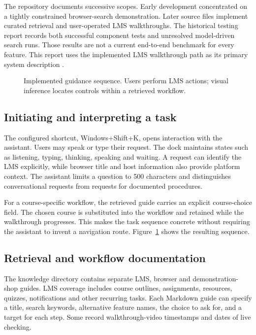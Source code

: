 \documentclass[11pt,a4paper]{article}
\begin{document}
The repository documents successive scopes. Early development concentrated on a tightly constrained browser-search demonstration. Later source files implement curated retrieval and user-operated LMS walkthroughs. The historical testing report records both successful component tests and unresolved model-driven search runs. Those results are not a current end-to-end benchmark for every feature. This report uses the implemented LMS walkthrough path as its primary system description \cite{project}.

\begin{figure}[htbp]\centering
{}
\caption{Implemented guidance sequence. Users perform LMS actions; visual inference locates controls within a retrieved workflow.}\label{fig:system}
\end{figure}

\subsection{Initiating and interpreting a task}
The configured shortcut, Windows+Shift+K, opens interaction with the assistant. Users may speak or type their request. The dock maintains states such as listening, typing, thinking, speaking and waiting. A request can identify the LMS explicitly, while browser title and host information also provide platform context. The assistant limits a question to 500 characters and distinguishes conversational requests from requests for documented procedures.

For a course-specific workflow, the retrieved guide carries an explicit course-choice field. The chosen course is substituted into the workflow and retained while the walkthrough progresses. This makes the task sequence concrete without requiring the assistant to invent a navigation route. Figure~\ref{fig:system} shows the resulting sequence.

\subsection{Retrieval and workflow documentation}
The knowledge directory contains separate LMS, browser and demonstration-shop guides. LMS coverage includes course outlines, assignments, resources, quizzes, notifications and other recurring tasks. Each Markdown guide can specify a title, search keywords, alternative feature names, the choice to ask for, and a target for each step. Some record walkthrough-video timestamps and dates of live checking.
\end{document}
